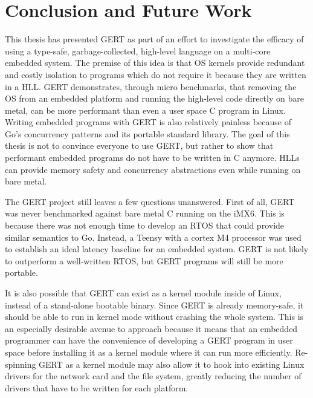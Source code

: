 \chapter{Conclusion and Future Work}

This thesis has presented GERT as part of an effort to investigate the efficacy of using
a type-safe, garbage-collected, high-level language on a multi-core embedded system. The premise
of this idea is that OS kernels provide redundant and costly isolation to programs which
do not require it because they are written in a HLL. GERT demonstrates, through micro benchmarks,
that removing the OS
from an embedded platform and running the high-level code directly on bare metal, can be
more performant than even a user space C program in Linux. Writing embedded programs with GERT
is also relatively painless because of Go's concurrency patterns and its portable standard library.
The goal of this thesis is not to convince everyone to use GERT, but rather to show that performant
embedded programs do not have to be written in C anymore. HLLs can provide memory safety and concurrency abstractions
even while running on bare metal.

The GERT project still leaves a few questions unanswered. First of all, GERT was
never benchmarked against bare metal C running on the iMX6. This is because there was not enough time to develop an
RTOS that could provide similar semantics to Go. Instead, a Teensy with a cortex M4 processor was used
to establish an ideal latency baseline for an embedded system. GERT is not likely to outperform a well-written
RTOS, but GERT programs will still be more portable.

It is also possible that GERT can exist as
a kernel module inside of Linux, instead of a stand-alone bootable binary. Since GERT is already
memory-safe, it should be able to run in kernel mode without crashing the whole system. This is
an especially desirable avenue to approach because it means that an embedded programmer can have
the convenience of developing a GERT program in user space before installing it as a kernel
module where it can run more efficiently. Re-spinning GERT as a kernel module may also
allow it to hook into existing Linux drivers for the network card and the file system, greatly reducing
the number of drivers that have to be written for each platform.
